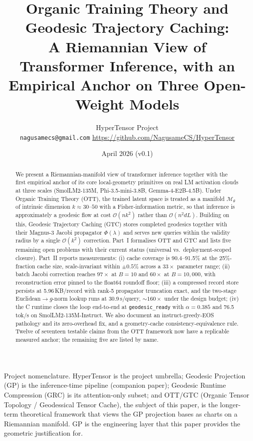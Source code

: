 \documentclass[11pt]{article}
\title{Organic Training Theory and Geodesic Trajectory Caching:\\
A Riemannian View of Transformer Inference, with an Empirical Anchor on Three Open-Weight Models}
\author{HyperTensor Project\\[2pt]
\small \texttt{nagusamecs@gmail.com} \quad \url{https://github.com/NagusameCS/HyperTensor}}
\date{April 2026 (v0.1)}
\begin{document}
\maketitle
\hypertensorbanner

\begin{htnote}
Project nomenclature.  HyperTensor is the project umbrella;
Geodesic Projection (GP) is the inference-time pipeline (companion
paper); Geodesic Runtime Compression (GRC) is its attention-only
subset; and OTT/GTC (Organic Tensor Topology / Geodessical Tensor
Cache), the subject of this paper, is the longer-term theoretical
framework that views the GP projection bases as charts on a Riemannian
manifold.  GP is the engineering layer that this paper provides the geometric
justification for.
\end{htnote}

\begin{abstract}
We present a Riemannian-manifold view of transformer inference together with the
first empirical anchor of its core local-geometry primitives on real LM activation
clouds at three scales (SmolLM2-135M, Phi-3.5-mini-3.8B, Gemma-4-E2B-4.5B).
Under Organic Training Theory (OTT), the trained latent space is treated as
a manifold $\mathcal{M}_\theta$ of intrinsic dimension $k\!\approx\!30$--$50$ with
a Fisher-information metric, so that inference is approximately a geodesic flow at
cost $\mathcal{O}(nk^2)$ rather than $\mathcal{O}(n^2 dL)$.
Building on this, Geodesic Trajectory Caching (GTC) stores completed
geodesics together with their Magnus-3 Jacobi propagator $\Phi(\lambda)$ and
serves new queries within the validity radius by a single $\mathcal{O}(k^2)$
correction. Part~I formalises OTT and GTC and lists five remaining open
problems with their current status (universal vs.\ deployment-scoped closure).
Part~II reports measurements: (i) cache coverage is
90.4--91.5\% at the 25\%-fraction cache size, scale-invariant within
$\pm 0.5\%$ across a $33\times$ parameter range; (ii) batch Jacobi correction
reaches $97\times$ at $B=10$ and $60\times$ at $B=10{,}000$, with
reconstruction error pinned to the float64 roundoff floor; (iii) a compressed
record store persists at 5.96\,KB/record with rank-5 propagator
truncation exact, and the two-stage Euclidean$\to g$-norm lookup runs at
30.9\,\textmu s/query, $\sim\!160\times$ under the design budget; (iv)
the C runtime closes the loop end-to-end at \texttt{geodesic\_ready} with
$\alpha=0.385$ and 76.5\,tok/s on SmolLM2-135M-Instruct. We also document an
instruct-greedy-EOS pathology and its zero-overhead fix, and a
geometry-cache consistency-equivalence rule. Twelve of seventeen testable
claims from the OTT framework now have a replicable measured anchor; the
remaining five are listed by name.
\end{abstract}
\end{document}
